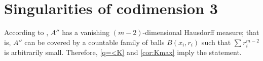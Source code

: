 \section{Singularities of codimension 3}\label{sec:codmi=3}


According to \cite[10.6]{BGP}, $A''$ has a vanishing $(m-2)$-dimensional Hausdorff measure;
that is, $A''$ can be covered by a countable family of balls $B(x_i,r_i)$ such that $\sum r_i^{m-2}$ is arbitrarily small.
Therefore, \ref{q=<K} and \ref{cor:Kmax} imply the statement.
\qeds

